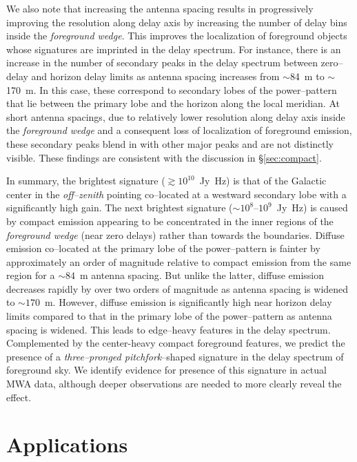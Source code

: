\documentclass[preprint2,iop,numberedappendix]{emulateapj}
\begin{document}
We also note that increasing the antenna spacing results in progressively improving the resolution along delay axis by increasing the number of delay bins inside the {\it foreground wedge}. This improves the localization of foreground objects whose signatures are imprinted in the delay spectrum. For instance, there is an increase in the number of secondary peaks in the delay spectrum between zero--delay and horizon delay limits as antenna spacing increases from $\sim$84~m to $\sim$170~m. In this case, these correspond to secondary lobes of the power--pattern that lie between the primary lobe and the horizon along the local meridian. At short antenna spacings, due to relatively lower resolution along delay axis inside the {\it foreground wedge} and a consequent loss of localization of foreground emission, these secondary peaks blend in with other major peaks and are not distinctly visible. These findings are consistent with the discussion in \S\ref{sec:compact}.

In summary, the brightest signature ($\gtrsim 10^{10}$~Jy~Hz) is that of the Galactic center in the {\it off--zenith} pointing co--located at a westward secondary lobe with a significantly high gain. The next brightest signature ($\sim 10^8$--$10^9$~Jy~Hz) is caused by compact emission appearing to be concentrated in the inner regions of the {\it foreground wedge} (near zero delays) rather than towards the boundaries. Diffuse emission co--located at the primary lobe of the power--pattern is fainter by approximately an order of magnitude relative to compact emission from the same region for a $\sim 84$~m antenna spacing. But unlike the latter, diffuse emission decreases rapidly by over two orders of magnitude as antenna spacing is widened to $\sim 170$~m. However, diffuse emission is significantly high near horizon delay limits compared to that in the primary lobe of the power--pattern as antenna spacing is widened. This leads to edge--heavy features in the delay spectrum. Complemented by the center-heavy compact foreground features, we predict the presence of a {\it three--pronged pitchfork}--shaped signature in the delay spectrum of foreground sky. We identify evidence for presence of this signature in actual MWA data, although deeper observations are needed to more clearly reveal the effect.

\section{Applications}\label{sec:fg-grading}
\end{document}
